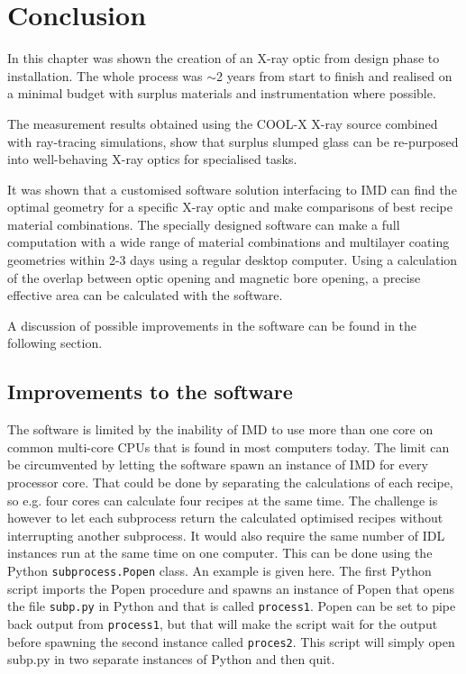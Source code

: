 \section{Conclusion}
In this chapter was shown the creation of an X-ray optic from design phase to installation. The whole process was $\sim$2 years from start to finish and realised on a minimal budget with surplus materials and instrumentation where possible.

The measurement results obtained using the COOL-X X-ray source combined with ray-tracing simulations, show that surplus slumped glass can be re-purposed into well-behaving X-ray optics for specialised tasks.

It was shown that a customised software solution interfacing to IMD can find the optimal geometry for a specific X-ray optic and make comparisons of best recipe material combinations. The specially designed software can make a full computation with a wide range of material combinations and multilayer coating geometries within 2-3 days using a regular desktop computer. Using a calculation of the overlap between optic opening and magnetic bore opening, a precise effective area can be calculated with the software.

A discussion of possible improvements in the software can be found in the following section.

\subsection{Improvements to the software}\label{sec:software_improvements}
The software is limited by the inability of IMD to use more than one core on common multi-core CPUs that is found in most computers today. The limit can be circumvented by letting the software spawn an instance of IMD for every processor core. That could be done by separating the calculations of each recipe, so e.g. four cores can calculate four recipes at the same time. The challenge is however to let each subprocess return the calculated optimised recipes without interrupting another subprocess. It would also require the same number of IDL instances run at the same time on one computer. This can be done using the Python \verb|subprocess.Popen| class. An example is given here. The first Python script imports the Popen procedure and spawns an instance of Popen that opens the file \verb|subp.py| in Python and that is called \verb|process1|. Popen can be set to pipe back output from \verb|process1|, but that will make the script wait for the output before spawning the second instance called \verb|proces2|. This script will simply open subp.py in two separate instances of Python and then quit.

